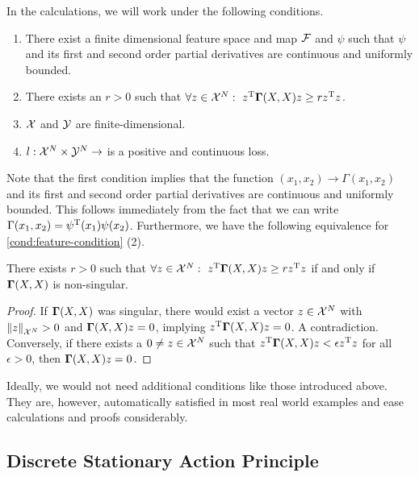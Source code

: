 In the calculations, we will work under the following conditions.
\begin{condition}
	\label{cond:feature-condition}\mbox{}
	\vspace*{-\parsep}
	\vspace*{-\baselineskip}
	\begin{enumerate}
		\item There exist a finite dimensional feature space and map $\mathcal{F}$ and $\psi$ such that $\psi$ and its first and second order partial derivatives are continuous and uniformly bounded.
		\item There exists an $r > 0$ such that $\forall z \in \mathcal{X}^N:~z^{\mathrm{T}} \mathbf{\Gamma}(X, X) z \geq r z^{\mathrm{T}} z$.
		\item $\mathcal{X}$ and $\mathcal{Y}$ are finite-dimensional.
		\item $l: \mathcal{X}^N \times \mathcal{Y}^N \rightarrow$ is a positive and continuous loss.
	\end{enumerate}
\end{condition}
Note that the first condition implies that the function $(x_1, x_2) \rightarrow \Gamma(x_1, x_2)$ and its first and second order partial derivatives are continuous and uniformly bounded.
This follows immediately from the fact that we can write $\Gamma(x_1, x_2) = \psi^{\mathrm{T}}(x_1)\psi(x_2)$.
Furthermore, we have the following equivalence for \cref{cond:feature-condition} (2).
\begin{lemma}
	There exists $r > 0$ such that $\forall z \in \mathcal{X}^N:~z^{\mathrm{T}} \mathbf{\Gamma}(X, X) z \geq r z^{\mathrm{T}} z$ if and only if $\mathbf{\Gamma}(X, X)$ is non-singular.
\end{lemma}
\begin{proof}
	If $\mathbf{\Gamma}(X, X)$ was singular, there would exist a vector $z \in \mathcal{X}^N$ with $\norm{z}_{\mathcal{X}^N} > 0$ and $\mathbf{\Gamma}(X, X) z = 0$, implying $z^{\mathrm{T}} \mathbf{\Gamma}(X, X)z = 0$. 
	A contradiction.
	Conversely, if there exists a $0 \neq z \in \mathcal{X}^N$ such that $z^{\mathrm{T}} \mathbf{\Gamma}(X, X) z < \epsilon z^{\mathrm{T}} z$ for all $\epsilon > 0$, then $\mathbf{\Gamma}(X, X) z = 0$.
\end{proof}
Ideally, we would not need additional conditions like those introduced above.
They are, however, automatically satisfied in most real world examples and ease calculations and proofs considerably.

\subsection{Discrete Stationary Action Principle}




